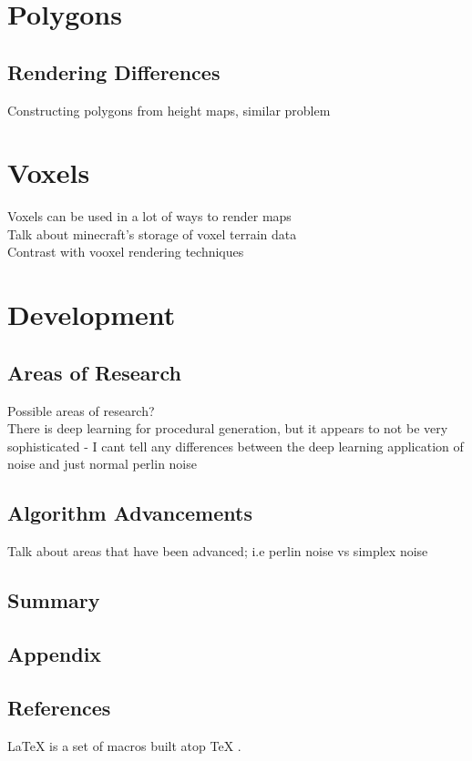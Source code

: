\documentclass[12pt]{report}
\begin{document}
	\chapter{Polygons}
		\section{Rendering Differences }
		Constructing polygons from height maps, similar problem
		\section{}
	
	\chapter{Voxels}
		Voxels can be used in a lot of ways to render maps \\
		Talk about minecraft's storage of voxel terrain data \\
		Contrast with vooxel rendering techniques
	\chapter{Development}
		\section{Areas of Research}
		Possible areas of research? \\
		There is deep learning for procedural generation, but it appears to not be very sophisticated - I cant tell any differences between the deep learning application of noise and just normal perlin noise\\
		\section{Algorithm Advancements}
		Talk about areas that have been advanced; i.e perlin noise vs simplex noise 
	
	\section{Summary}
	\section{Appendix}
	\section{References}
	
	\LaTeX{} \cite{7522149} is a set of macros built atop \TeX{} \cite{7522149}.
		
		
	

	
\end{document}
